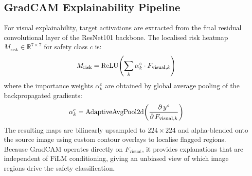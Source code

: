 \subsection{GradCAM Explainability Pipeline}

For visual explainability, target activations are extracted from the final
residual convolutional layer of the ResNet101 backbone.  The localised risk
heatmap $M_{\text{risk}} \in \mathbb{R}^{7 \times 7}$ for safety class $c$ is:
\begin{equation}
    M_{\text{risk}}
    = \operatorname{ReLU}\!\left(\sum_{k} \alpha_k^c \cdot F_{\text{visual},k}\right) \notag
\end{equation}
where the importance weights $\alpha_k^c$ are obtained by global average
pooling of the backpropagated gradients:
\begin{equation}
    \alpha_k^c
    = \operatorname{AdaptiveAvgPool2d}\!\left(
        \frac{\partial\, y^c}{\partial\, F_{\text{visual},k}}
      \right) \notag
\end{equation}
The resulting maps are bilinearly upsampled to $224{\times}224$ and
alpha-blended onto the source image using custom contour overlays to localise
flagged regions.  Because GradCAM operates directly on $F_{\text{visual}}$, it
provides explanations that are independent of FiLM conditioning, giving an
unbiased view of which image regions drive the safety classification.

